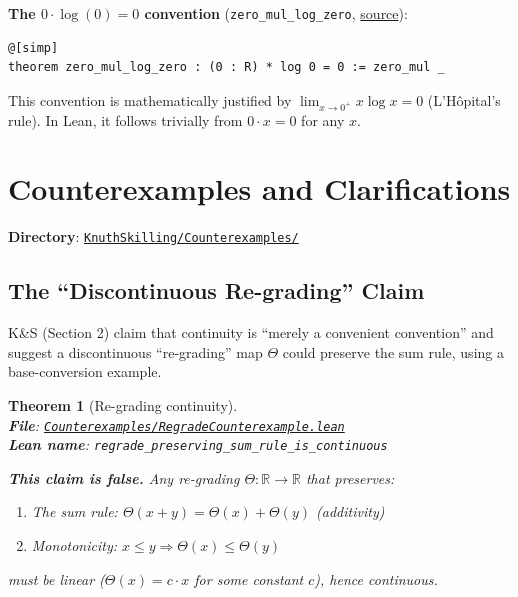 \documentclass[11pt]{article}
\newtheorem{theorem}{Theorem}[section]
\theoremstyle{definition}
\theoremstyle{remark}
\begin{document}
\textbf{The $0 \cdot \log(0) = 0$ convention} (\texttt{zero\_mul\_log\_zero}, \href{https://github.com/zariuq/ks-foundations-of-inference/blob/main/KnuthSkilling/Information/InformationEntropy.lean}{source}):
\begin{lstlisting}[caption={Convention for entropy at zero probability},numbers=none]
@[simp]
theorem zero_mul_log_zero : (0 : R) * log 0 = 0 := zero_mul _
\end{lstlisting}
This convention is mathematically justified by $\lim_{x \to 0^+} x \log x = 0$ (L'H\^opital's rule). In Lean, it follows trivially from $0 \cdot x = 0$ for any $x$.

\section{Counterexamples and Clarifications}

\textbf{Directory}: \href{https://github.com/zariuq/ks-foundations-of-inference/tree/main/KnuthSkilling/Counterexamples/}{\texttt{KnuthSkilling/Counterexamples/}}

\subsection{The ``Discontinuous Re-grading'' Claim}

K\&S (Section 2) claim that continuity is ``merely a convenient convention'' and suggest
a discontinuous ``re-grading'' map $\Theta$ could preserve the sum rule, using a
base-conversion example.

\begin{theorem}[Re-grading continuity]
\leavevmode\\
\textbf{File}: \href{https://github.com/zariuq/ks-foundations-of-inference/blob/main/KnuthSkilling/Counterexamples/RegradeCounterexample.lean}{\texttt{Counterexamples/RegradeCounterexample.lean}}\\
\textbf{Lean name}: \texttt{regrade\_preserving\_sum\_rule\_is\_continuous}

\textbf{This claim is false.} Any re-grading $\Theta: \mathbb{R} \to \mathbb{R}$ that preserves:
\begin{enumerate}
\item The sum rule: $\Theta(x + y) = \Theta(x) + \Theta(y)$ (additivity)
\item Monotonicity: $x \leq y \Rightarrow \Theta(x) \leq \Theta(y)$
\end{enumerate}
must be linear ($\Theta(x) = c \cdot x$ for some constant $c$), hence continuous.
\end{theorem}
\end{document}
